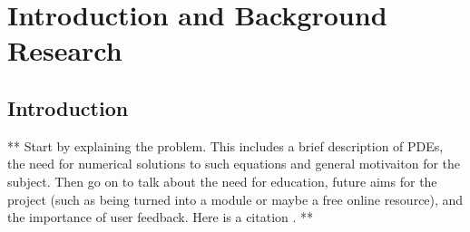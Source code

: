 \chapter{Introduction and Background Research}

\label{chapter1}

\section{Introduction}


** Start by explaining the problem. This includes a brief description of PDEs, the need for numerical solutions to such equations and general motivaiton for the subject. Then go on to talk about the need for education, future aims for the project (such as being turned into a module or maybe a free online resource), and the importance of user feedback. Here is a citation \cite{parikh1980adaptive}. **




